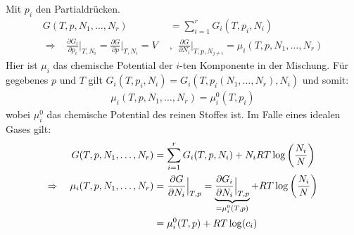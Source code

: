 Mit $p_i$ den Partialdrücken.
\begin{align*}
    G(T,p,N_1,\dots,N_r)
    &= \sum_{i=1}^r G_i (T,p_i,N_i)
    \\
    \Rightarrow \hspace{10pt}
    \frac{\partial G_i}{\partial p_i} \Big|_{T,N_i}
    = \frac{\partial G}{\partial p} \Big|_{T,N_i}
    = V
    \hspace{5pt} &, \hspace{5pt}
    \frac{\partial G}{\partial N_i} \Big|_{T,p,N_{j \neq i}}
    = \mu_i (T,p,N_1,\dots,N_r)
\end{align*}
Hier ist $\mu_i$ das chemische Potential der $i$-ten Komponente in der
Mischung. Für gegebenes $p$ und $T$ gilt $G_i (T,p_i,N_i) = G_i (T,p_i(N_1,\dots,N_r),N_i)$
und somit:
\begin{align*}
    \mu_i (T,p,N_1,\dots,N_r)
    = \mu_i^0 (T,p_i)
\end{align*}
wobei $\mu_i^0$ das chemische Potential des reinen Stoffes ist.
Im Falle eines idealen Gases gilt:
\begin{align*}
    G(T,p,N_1,\dots,N_r) &= \sum_{i=1}^r G_i (T,p,N_i) + N_i R T \log \left( \frac{N_i}{N} \right)
    \\
    \Rightarrow \hspace{10pt}
    \mu_i(T,p,N_1,\dots,N_r) &= \frac{\partial G}{\partial N_i} \Big|_{T,p}
    = \underbrace{\frac{\partial G_i}{\partial N_i} \Big|_{T,p}}_{=\mu_i^0 (T,p)}
        + R T \log \left( \frac{N_i}{N} \right)
    \\
    &= \mu_i^0 (T,p) + R T \log(c_i)
\end{align*}

\vspace{-3pt}

